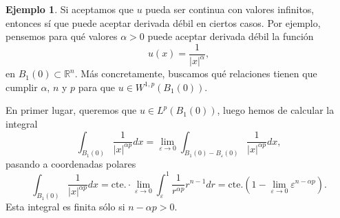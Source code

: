 \documentclass[12pt,a4paper]{book}
\theoremstyle{definition} \newtheorem{defn}[thm]{Definición}
\theoremstyle{definition} \newtheorem{ejemplo}[thm]{Ejemplo}
\theoremstyle{definition} \newtheorem{ejercicio}[thm]{Ejercicio}
\theoremstyle{remark} \newtheorem*{obs}{Observación}
\newcommand{\RR}{\mathbb{R}}
\newcommand{\cte}{\mathrm{cte.}}
\newcommand{\eps}{\varepsilon}
\begin{document}
  \begin{ejemplo}
    Si aceptamos que $u$ pueda ser continua con valores infinitos, entonces sí que puede aceptar derivada débil en ciertos casos. Por ejemplo, pensemos para qué valores $\alpha>0$ puede aceptar derivada débil la función
    \begin{equation*}
      u(x)=\frac{1}{|x|^{\alpha}},
    \end{equation*}
    en $B_1(0)\subset \RR^n$. Más concretamente, buscamos qué relaciones tienen que cumplir $\alpha$, $n$ y $p$ para que $u\in W^{1,p}(B_1(0))$.

    En primer lugar, queremos que $u\in L^p(B_1(0))$, luego hemos de calcular la integral
    \begin{equation*}
      \int_{B_1(0)}\frac{1}{|x|^{\alpha p}}dx = \lim_{\eps \rightarrow 0} \int_{B_1(0)-B_\eps(0)}\frac{1}{|x|^{\alpha p}}dx,
    \end{equation*}
    pasando a coordenadas polares
    \begin{equation*}
      \int_{B_1(0)}\frac{1}{|x|^{\alpha p}}dx=\cte \cdot \lim_{\eps\rightarrow 0} \int_\eps^1 \frac{1}{r^{\alpha p}}r^{n-1} dr = \cte (1-\lim_{\eps \rightarrow 0} \eps^{n-\alpha p}).
    \end{equation*}
    Esta integral es finita sólo si $n-\alpha p >0$.


\end{ejemplo}
\end{document}
